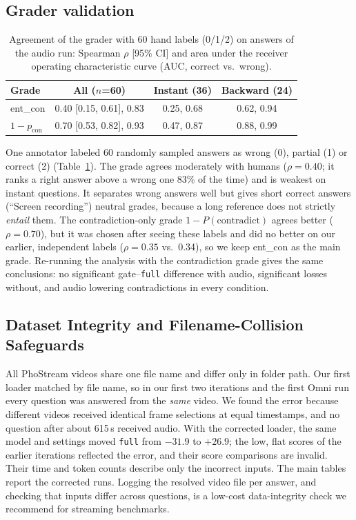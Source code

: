 \documentclass[conference]{IEEEtran}
\newcommand{\cond}[1]{\texttt{#1}}
\begin{document}
\subsection{Grader validation}
\begin{table}[t]
\centering
\caption{Agreement of the grader with 60 hand labels (0/1/2) on answers of the audio run: Spearman $\rho$ [95\% CI] and area under the receiver operating characteristic curve (AUC, correct vs.\ wrong).}
\label{tab:grader}
\setlength{\tabcolsep}{3pt}
\begin{tabular}{@{}lccc@{}}
\toprule
Grade & All ($n$=60) & Instant (36) & Backward (24) \\
\midrule
ent\_con   & 0.40 [0.15, 0.61], 0.83 & 0.25, 0.68 & 0.62, 0.94 \\
$1-p_{\text{con}}$ & 0.70 [0.53, 0.82], 0.93 & 0.47, 0.87 & 0.88, 0.99 \\
\bottomrule
\end{tabular}
\end{table}
One annotator labeled 60 randomly sampled answers as wrong (0), partial (1) or correct (2) (Table~\ref{tab:grader}). The grade agrees moderately with humans ($\rho{=}0.40$; it ranks a right answer above a wrong one 83\% of the time) and is weakest on instant questions. It separates wrong answers well but gives short correct answers (``Screen recording'') neutral grades, because a long reference does not strictly \emph{entail} them. The contradiction-only grade $1-P(\text{contradict})$ agrees better ($\rho{=}0.70$), but it was chosen after seeing these labels and did no better on our earlier, independent labels ($\rho{=}0.35$ vs.\ 0.34), so we keep ent\_con as the main grade. Re-running the analysis with the contradiction grade gives the same conclusions: no significant gate--\cond{full} difference with audio, significant losses without, and audio lowering contradictions in every condition.

\subsection{Dataset Integrity and Filename-Collision Safeguards}
All PhoStream videos share one file name and differ only in folder path. Our first loader matched by file name, so in our first two iterations and the first Omni run every question was answered from the \emph{same} video. We found the error because different videos received identical frame selections at equal timestamps, and no question after about 615\,s received audio. With the corrected loader, the same model and settings moved \cond{full} from $-31.9$ to $+26.9$; the low, flat scores of the earlier iterations reflected the error, and their score comparisons are invalid. Their time and token counts describe only the incorrect inputs. The main tables report the corrected runs. Logging the resolved video file per answer, and checking that inputs differ across questions, is a low-cost data-integrity check we recommend for streaming benchmarks.
\end{document}
